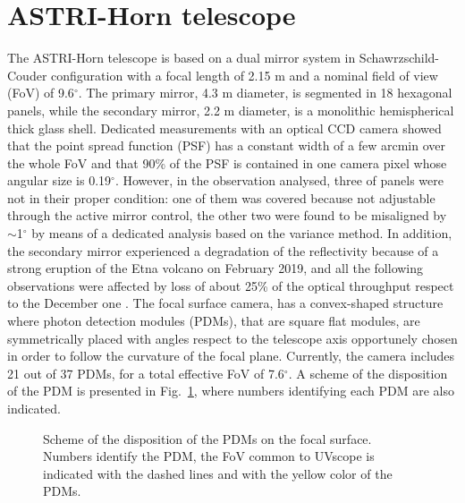 \section{ASTRI-Horn telescope} 
The ASTRI-Horn telescope is based on a dual mirror system in Schawrzschild-Couder configuration with a focal length of 2.15 m and a nominal field of view (FoV) of 9.6$^\circ$. 
The primary mirror, 4.3 m diameter, is segmented in 18 hexagonal panels, while the secondary mirror, 2.2 m diameter, is a monolithic hemispherical thick glass shell. 
Dedicated measurements  with an optical CCD camera showed that the point spread function (PSF) has a constant width of a few arcmin
over the whole FoV and that  90\% of the PSF  is contained in one camera pixel \citep{Giro2017}
whose angular size is 0.19$^\circ$. 
However, in the observation analysed, three of panels were not in their proper condition:
one of them was covered because not adjustable through the active mirror control, the other two were found to be misaligned by $\sim$1$^\circ$ by means of a dedicated analysis based on the variance method.
In addition, the secondary mirror experienced a degradation of the reflectivity because of a strong eruption of the Etna volcano on February 2019, and all the following observations were affected by loss of about 25\% of the optical throughput
respect to the December one \citep{Mineo2019}. 
The focal surface camera, has a convex-shaped structure where photon detection modules (PDMs), that are square flat modules, are symmetrically placed with angles respect to the telescope axis opportunely chosen in order to follow the curvature of the focal plane.
Currently, the camera includes 21 out of 37 PDMs, for a total effective FoV of 7.6$^\circ$.
A scheme of the disposition of the PDM is presented in Fig.~\ref{fig:camera}, where numbers identifying each PDM are also indicated. 
\begin{figure}
\caption{Scheme of the disposition of the PDMs on the focal surface. Numbers identify the PDM, the FoV common to UVscope is indicated with the dashed lines and with the yellow color of the PDMs.}
\label{fig:camera}
\end{figure}

